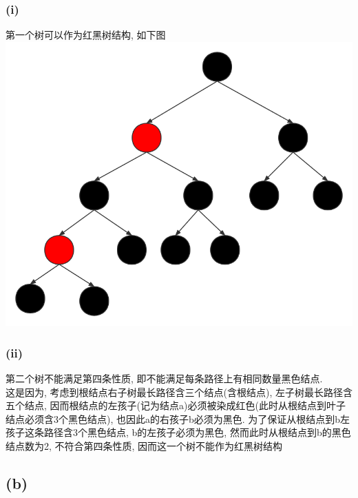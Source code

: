 \documentclass{article}
\begin{document}
\subsubsection{(i)}
第一个树可以作为红黑树结构, 如下图 \\
\includegraphics[scale=0.4]{Figure1.png}
\subsubsection{(ii)}
第二个树不能满足第四条性质, 即不能满足每条路径上有相同数量黑色结点. \\
这是因为, 考虑到根结点右子树最长路径含三个结点(含根结点), 左子树最长路径含五个结点, 因而根结点的左孩子(记为结点a)必须被染成红色(此时从根结点到叶子结点必须含3个黑色结点), 也因此a的右孩子b必须为黑色. 为了保证从根结点到b左孩子这条路径含3个黑色结点, b的左孩子必须为黑色, 然而此时从根结点到b的黑色结点数为2, 不符合第四条性质, 因而这一个树不能作为红黑树结构

\subsection{(b)}
\end{document}
